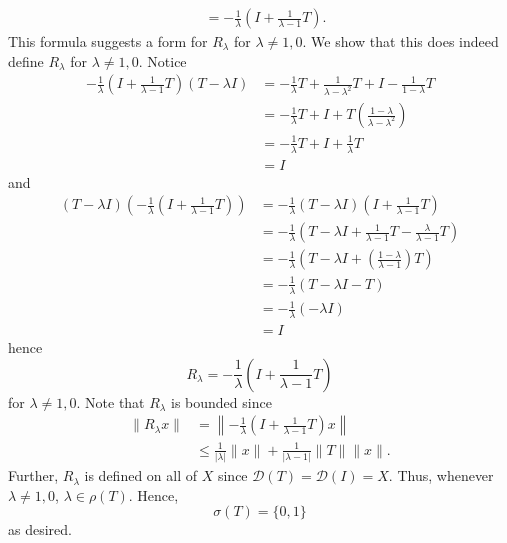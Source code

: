 \documentclass{article}
\begin{document}
\begin{itemize}
\begin{align*}
        &= -\frac{1}{\lambda}\left(I + \frac{1}{\lambda - 1}T\right).
    \end{align*}
    This formula suggests a form for $R_{\lambda}$ for $\lambda \neq 1,0$. We show that this does indeed define $R_{\lambda}$ for $\lambda \neq 1,0$. Notice
    \begin{align*}
        -\frac{1}{\lambda}\left(I + \frac{1}{\lambda - 1}T\right)(T - \lambda I) &= -\frac{1}{\lambda}T + \frac{1}{\lambda - \lambda^2}T + I  - \frac{1}{1 - \lambda}T\\
        &= -\frac{1}{\lambda}T + I + T\left(\frac{1 - \lambda}{\lambda - \lambda^2}\right)\\
        &= -\frac{1}{\lambda}T + I + \frac{1}{\lambda}T\\
        &= I
    \end{align*}
    and
    \begin{align*}
        (T - \lambda I) \left(-\frac{1}{\lambda}\left(I + \frac{1}{\lambda - 1}T\right)\right) &= -\frac{1}{\lambda}(T - \lambda I)\left(I + \frac{1}{\lambda - 1}T\right)\\
        &= -\frac{1}{\lambda}\left(T - \lambda I + \frac{1}{\lambda - 1}T - \frac{\lambda}{\lambda - 1}T\right)\\
        &= -\frac{1}{\lambda}\left(T - \lambda I + \left(\frac{1 - \lambda}{\lambda - 1}\right)T\right)\\
        &= -\frac{1}{\lambda}(T - \lambda I - T)\\
        &= -\frac{1}{\lambda}(-\lambda I)\\
        &= I
    \end{align*}
    hence
    \[R_{\lambda} = -\frac{1}{\lambda}\left(I + \frac{1}{\lambda - 1}T\right)\]
    for $\lambda \neq 1,0$. Note that $R_{\lambda}$ is bounded since
    \begin{align*}
        \|R_{\lambda}x\| &= \left\|-\frac{1}{\lambda}\left(I + \frac{1}{\lambda - 1}T\right)x\right\|\\
        &\leq \frac{1}{|\lambda|}\|x\| + \frac{1}{|\lambda - 1|}\|T\|\|x\|.
    \end{align*}
    Further, $R_{\lambda}$ is defined on all of $X$ since $\mathcal{D}(T) = \mathcal{D}(I) = X$. Thus, whenever $\lambda \neq 1,0$, $\lambda \in \rho(T)$. Hence,
    \[\sigma(T) = \{0,1\}\]
    as desired.
\end{itemize}
\end{document}

